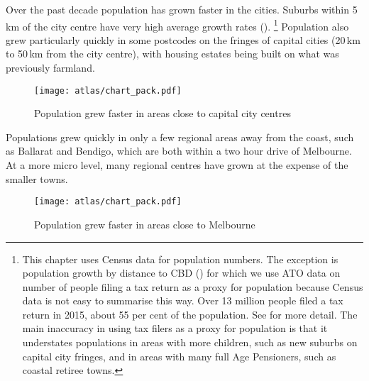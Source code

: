 \documentclass{article}
\begin{document}
Over the past decade population has grown faster in the cities. Suburbs within 5\,km of the city centre have very high average growth rates ().%
\footnote{This chapter uses Census data for population numbers. The exception is population growth by distance to CBD () for which we use ATO data on number of people filing a tax return as a proxy for population because Census data is not easy to summarise this way. Over 13 million people filed a tax return in 2015, about 55 per cent of the population. See  for more detail. The main inaccuracy in using tax filers as a proxy for population is that it understates populations in areas with more children, such as new suburbs on capital city fringes, and in areas with many full Age Pensioners, such as coastal retiree towns.}
Population also grew particularly quickly in some postcodes on the fringes of capital cities (20\,km to 50\,km from the city centre), with housing estates being built on what was previously farmland.

\begin{figure}
\caption{Population grew faster in areas close to capital city centres\label{fig:population-grew-faster}}
\texttt{[image: atlas/chart\_pack.pdf]} 
\end{figure}

Populations grew quickly in only a few regional areas away from the coast, such as Ballarat and Bendigo, which are both within a two hour drive of Melbourne. At a more micro level, many regional centres have grown at the expense of the smaller towns.

\begin{figure}
\caption{Population grew faster in areas close to Melbourne\label{fig:population-grew-faster-melbourne}}
\texttt{[image: atlas/chart\_pack.pdf]} 
\end{figure}
\end{document}
